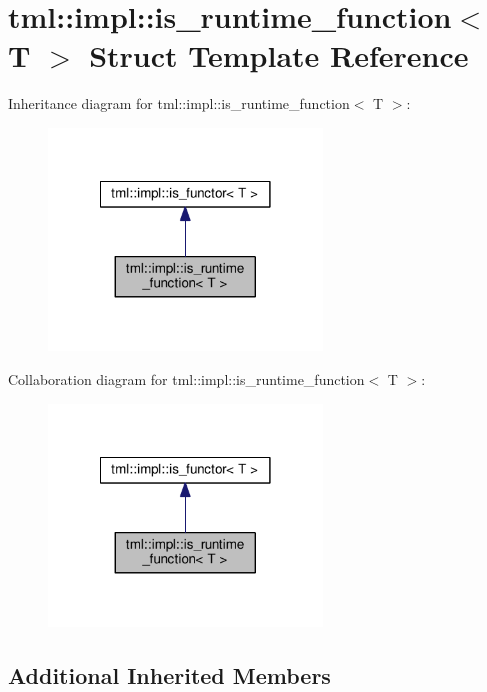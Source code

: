 \hypertarget{structtml_1_1impl_1_1is__runtime__function}{\section{tml\+:\+:impl\+:\+:is\+\_\+runtime\+\_\+function$<$ T $>$ Struct Template Reference}
\label{structtml_1_1impl_1_1is__runtime__function}
}


Inheritance diagram for tml\+:\+:impl\+:\+:is\+\_\+runtime\+\_\+function$<$ T $>$\+:
\nopagebreak
\begin{figure}[H]
\begin{center}
\leavevmode
\includegraphics[width=206pt]{structtml_1_1impl_1_1is__runtime__function__inherit__graph}
\end{center}
\end{figure}


Collaboration diagram for tml\+:\+:impl\+:\+:is\+\_\+runtime\+\_\+function$<$ T $>$\+:
\nopagebreak
\begin{figure}[H]
\begin{center}
\leavevmode
\includegraphics[width=206pt]{structtml_1_1impl_1_1is__runtime__function__coll__graph}
\end{center}
\end{figure}
\subsection*{Additional Inherited Members}


